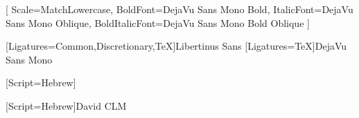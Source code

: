 \usepackage{pgfplots} %
\usepackage{pgfplotstable}
\usepackage{enumitem} %
\usepackage{booktabs} %
\usepackage{listings}
\usepackage{xcolor}

\pgfplotsset{compat=1.18} %
\usepackage{caption} %
\usepackage{mathrsfs,amsmath}   %
\usepackage[top=2cm,bottom=2cm,left=2.5cm,right=2cm]{geometry}
\usepackage{array} %
\usepackage{ragged2e} %
\usepackage{framed}
\usepackage{listings}
\usepackage{fancyvrb} %


\usepackage{fontspec}
\setmonofont{DejaVu Sans Mono}[
    Scale=MatchLowercase,
    BoldFont={DejaVu Sans Mono Bold},
    ItalicFont={DejaVu Sans Mono Oblique}, %
    BoldItalicFont={DejaVu Sans Mono Bold Oblique}
]

\usepackage{minted}
\usepackage{tcolorbox} %

\usepackage[english, bidi=basic, layout=sectioning.tabular]{babel}
          [Ligatures={Common,Discretionary,TeX}]{Libertinus Sans}
          [Ligatures=TeX]{DejaVu Sans Mono} %



\setmainfont{David CLM}[Script=Hebrew]

[Script=Hebrew]{David CLM}

\newfontfamily{} %
\newfontfamily{}
\newfontfamily{} %
          

\newenvironment{solution}{\begin{proof}[Solution]}{\end{proof}}

\newcommand{\EN}{\selectlanguage{english}}
\newcommand{\HE}{\selectlanguage{hebrew} \vspace{0pt}}
\newcommand{\ToEn}[1]{\EN{#1}\HE}

